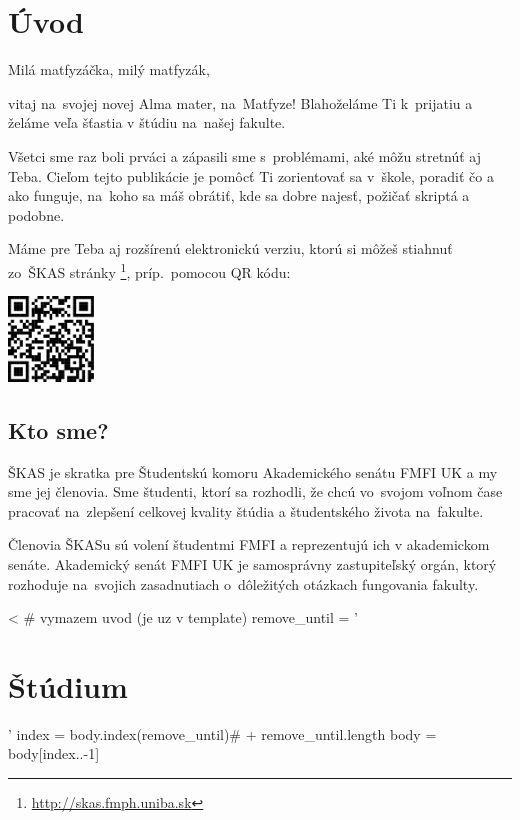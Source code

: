 \documentclass[11pt,slovak,twosides,openany]{scrbook}
\begin{document}

\chapter{Úvod}

Milá matfyzáčka, milý matfyzák,

vitaj na~svojej novej Alma mater, na~Matfyze! Blahoželáme Ti k~prijatiu
a želáme veľa šťastia v štúdiu na~našej fakulte.

Všetci sme raz boli prváci a zápasili sme s~problémami, aké môžu stretnúť
aj Teba. Cieľom tejto publikácie je pomôcť Ti zorientovať sa v~škole,
poradiť čo a ako funguje, na~koho sa máš obrátiť, kde sa dobre najesť,
požičať skriptá a podobne.

Máme pre Teba aj rozšírenú elektronickú verziu, ktorú si môžeš stiahnuť
zo~ŠKAS stránky%
\footnote{\href{http://skas.fmph.uniba.sk}{http://skas.fmph.uniba.sk}%
}, príp.\ pomocou QR kódu:

\begin{center}
\includegraphics[width=0.17\textwidth]{images/qr_code}
\par\end{center}

\section*{Kto sme?}

ŠKAS je skratka pre Študentskú komoru Akademického senátu FMFI UK
a my sme jej členovia. Sme študenti, ktorí sa rozhodli, že chcú vo~svojom
voľnom čase pracovať na~zlepšení celkovej kvality štúdia a študentského
života na~fakulte. 

Členovia ŠKASu sú volení študentmi FMFI a reprezentujú ich v akademickom
senáte. Akademický senát FMFI UK je samosprávny zastupiteľský orgán,
ktorý rozhoduje na svojich zasadnutiach o~dôležitých otázkach fungovania
fakulty. 

<%
# vymazem uvod (je uz v template)
remove_until = '\chapter{Štúdium}'
index = body.index(remove_until)# + remove_until.length
body = body[index..-1]
\end{document}
